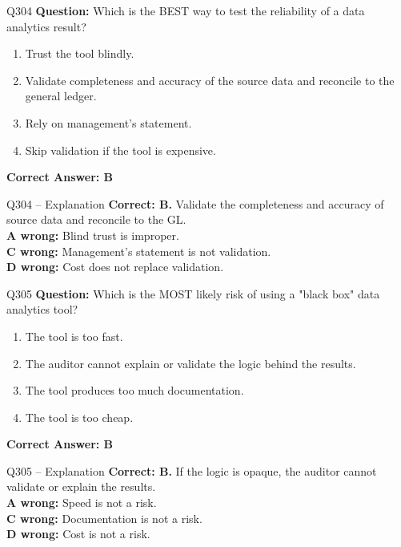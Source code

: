 \documentclass[aspectratio=169,10pt]{beamer}
\begin{document}
	\begin{frame}[t]{Q304}
		\small
		\textbf{Question:} Which is the BEST way to test the reliability of a data analytics result?
		\begin{enumerate}[label=\Alph*.,itemsep=1pt,topsep=2pt]
			\item Trust the tool blindly.
			\item Validate completeness and accuracy of the source data and reconcile to the general ledger.
			\item Rely on management's statement.
			\item Skip validation if the tool is expensive.
		\end{enumerate}
		\vspace{4pt}
		\textbf{Correct Answer: B}
	\end{frame}
	
	\begin{frame}[t]{Q304 -- Explanation}
		\small
		\textbf{Correct: B.} Validate the completeness and accuracy of source data and reconcile to the GL. \\[4pt]
		\textbf{A wrong:} Blind trust is improper. \\[2pt]
		\textbf{C wrong:} Management's statement is not validation. \\[2pt]
		\textbf{D wrong:} Cost does not replace validation.
	\end{frame}
	
	\begin{frame}[t]{Q305}
		\small
		\textbf{Question:} Which is the MOST likely risk of using a "black box" data analytics tool?
		\begin{enumerate}[label=\Alph*.,itemsep=1pt,topsep=2pt]
			\item The tool is too fast.
			\item The auditor cannot explain or validate the logic behind the results.
			\item The tool produces too much documentation.
			\item The tool is too cheap.
		\end{enumerate}
		\vspace{4pt}
		\textbf{Correct Answer: B}
	\end{frame}
	
	\begin{frame}[t]{Q305 -- Explanation}
		\small
		\textbf{Correct: B.} If the logic is opaque, the auditor cannot validate or explain the results. \\[4pt]
		\textbf{A wrong:} Speed is not a risk. \\[2pt]
		\textbf{C wrong:} Documentation is not a risk. \\[2pt]
		\textbf{D wrong:} Cost is not a risk.
	\end{frame}
	
\end{document}
